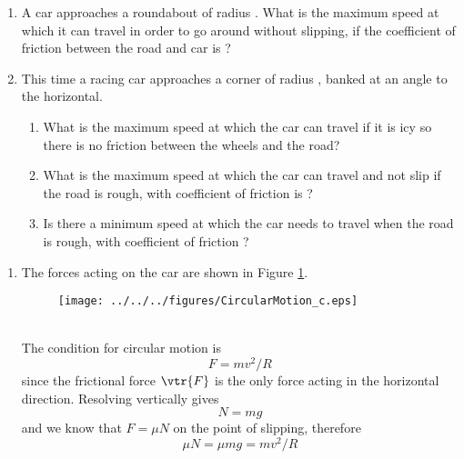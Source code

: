 

\begin{problem}
{
\begin{enumerate}
\item A car approaches a roundabout of radius . What is the maximum speed at which it can travel in order to go around without slipping, if the coefficient of friction between the road and car is \vari{\mu}?
\item This time a racing car approaches a corner of radius , banked at an angle \vari{\theta} to the horizontal. 
\begin{enumerate}
\item What is the maximum speed at which the car can travel if it is icy so there is no friction between the wheels and the road?
\item What is the maximum speed at which the car can travel and not slip if the road is rough, with coefficient of friction is \vari{\mu}?
\item Is there a minimum speed at which the car needs to travel when the road is rough, with coefficient of friction \vari{\mu}?\end{enumerate} \end{enumerate}}
{}
{\begin{enumerate}
\item The forces acting on the car are shown in Figure \ref{fig:CircularMotion_c}.
\begin{figure}[h]
\centering
\texttt{[image: ../../../figures/CircularMotion\_c.eps]}
\caption{}
\label{fig:CircularMotion_c}
\end{figure}
\\
The condition for circular motion is
\begin{equation*}
F=mv^2/R
\end{equation*}
since the frictional force $\vtr{F}$ is the only force acting in the horizontal direction. Resolving vertically gives
\begin{equation*}
N=mg
\end{equation*}
and we know that $F=\mu N$ on the point of slipping, therefore
\begin{equation*}
\mu N=\mu mg=mv^2/R
\end{equation*}

\end{enumerate}}
\end{problem}
